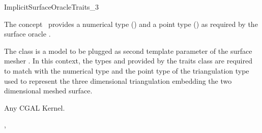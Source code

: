 

\begin{ccRefConcept}{ImplicitSurfaceOracleTraits_3}


\ccDefinition
  
The concept \ccRefName\ provides a numerical type  ()
and a point type ()
as  required by the surface oracle
.

The class 
is a model to be plugged 
as  second template parameter of the surface mesher
. 
In this context, the types  and 
provided by the traits class are required to match with the numerical type
and the point type of the triangulation type 
used to represent the three dimensional triangulation embedding
the two dimensional meshed surface.



\ccTypes

\ccGlue
{}





\ccHasModels

Any CGAL Kernel.


\ccSeeAlso

,\\



\end{ccRefConcept}

